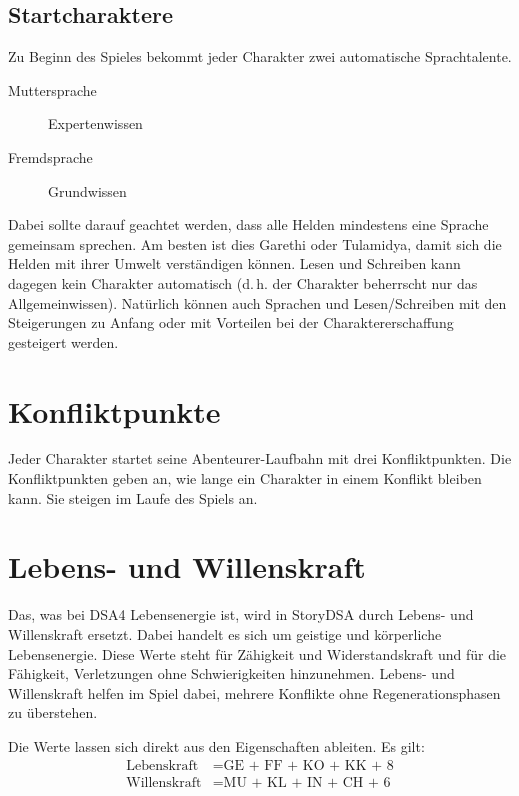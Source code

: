 \subsection{Startcharaktere}
Zu Beginn des Spieles bekommt jeder Charakter zwei automatische Sprachtalente.
\begin{description}
\item[Muttersprache] Expertenwissen
\item[Fremdsprache] Grundwissen
\end{description}
Dabei sollte darauf geachtet werden, dass alle Helden mindestens eine Sprache gemeinsam sprechen. Am besten ist dies Garethi oder Tulamidya, damit sich die Helden mit ihrer Umwelt verständigen können. Lesen und Schreiben kann dagegen kein Charakter automatisch (d.\,h. der Charakter beherrscht nur das Allgemeinwissen). Natürlich können auch Sprachen und Lesen/Schreiben mit den Steigerungen zu Anfang oder mit Vorteilen bei der Charaktererschaffung gesteigert werden.


\section{Konfliktpunkte}
Jeder Charakter startet seine Abenteurer-Laufbahn mit drei Konfliktpunkten. Die Konfliktpunkten geben an, wie lange ein Charakter in einem Konflikt bleiben kann. Sie steigen im Laufe des Spiels an.



\pagebreak[3]
\section{Lebens- und Willenskraft}
 Das, was bei DSA4 Lebensenergie ist, wird in StoryDSA durch Lebens- und Willenskraft ersetzt. Dabei handelt es sich um geistige und körperliche Lebensenergie. Diese Werte steht für Zähigkeit und Widerstandskraft und für die Fähigkeit, Verletzungen ohne Schwierigkeiten hinzunehmen. Lebens- und Willenskraft helfen im Spiel dabei, mehrere Konflikte ohne Regenerationsphasen zu überstehen.

Die Werte lassen sich direkt aus den Eigenschaften ableiten. Es gilt:
\begin{align*}
	\text{Lebenskraft} &= \text{GE + FF + KO + KK + 8} \\
	\text{Willenskraft} &= \text{MU + KL + IN + CH + 6} \\
\end{align*}



